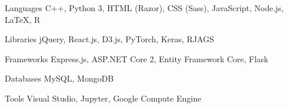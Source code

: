 

\begin{cvskills}

  \cvskill
    {Languages} %
    {C++, Python 3, HTML (Razor), CSS (Sass), JavaScript, Node.js, LaTeX, R} %

  \cvskill
    {Libraries} %
    {jQuery, React.js, D3.js, PyTorch, Keras, RJAGS} %

  \cvskill
    {Frameworks} %
    {Express.js, ASP.NET Core 2, Entity Framework Core, Flask} %

  \cvskill
    {Databases} %
    {MySQL, MongoDB} %
    
  \cvskill
    {Tools} %
    {Visual Studio, Jupyter, Google Compute Engine} %

\end{cvskills}
